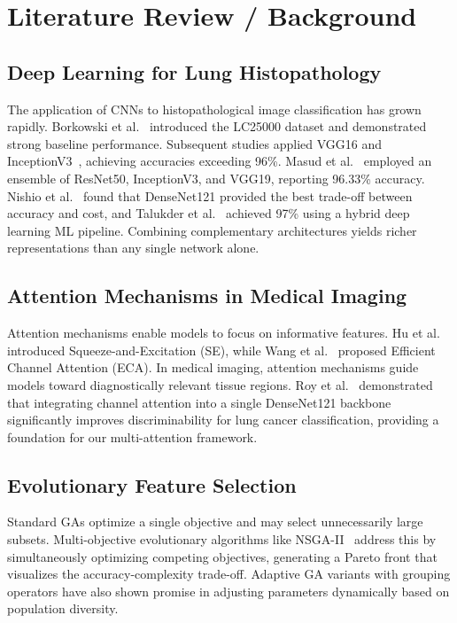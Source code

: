 \documentclass[11pt,a4paper]{article}
\begin{document}
\section{Literature Review / Background}

\subsection{Deep Learning for Lung Histopathology}
The application of CNNs to histopathological image classification has grown rapidly. Borkowski et al.~\cite{borkowski2019lung} introduced the LC25000 dataset and demonstrated strong baseline performance. Subsequent studies applied VGG16 and InceptionV3~\cite{mangal2020convolution}, achieving accuracies exceeding 96\%. Masud et al.~\cite{masud2021machine} employed an ensemble of ResNet50, InceptionV3, and VGG19, reporting 96.33\% accuracy. Nishio et al.~\cite{nishio2021lung} found that DenseNet121 provided the best trade-off between accuracy and cost, and Talukder et al.~\cite{talukder2022machine} achieved 97\% using a hybrid deep learning ML pipeline. Combining complementary architectures yields richer representations than any single network alone.

\subsection{Attention Mechanisms in Medical Imaging}
Attention mechanisms enable models to focus on informative features. Hu et al.~\cite{hu2018squeeze} introduced Squeeze-and-Excitation (SE), while Wang et al.~\cite{wang2020eca} proposed Efficient Channel Attention (ECA). In medical imaging, attention mechanisms guide models toward diagnostically relevant tissue regions. Roy et al.~\cite{roy2025grouping} demonstrated that integrating channel attention into a single DenseNet121 backbone significantly improves discriminability for lung cancer classification, providing a foundation for our multi-attention framework.

\subsection{Evolutionary Feature Selection}
Standard GAs optimize a single objective and may select unnecessarily large subsets. Multi-objective evolutionary algorithms like NSGA-II~\cite{deb2002fast} address this by simultaneously optimizing competing objectives, generating a Pareto front that visualizes the accuracy-complexity trade-off. Adaptive GA variants with grouping operators have also shown promise in adjusting parameters dynamically based on population diversity.
\end{document}
